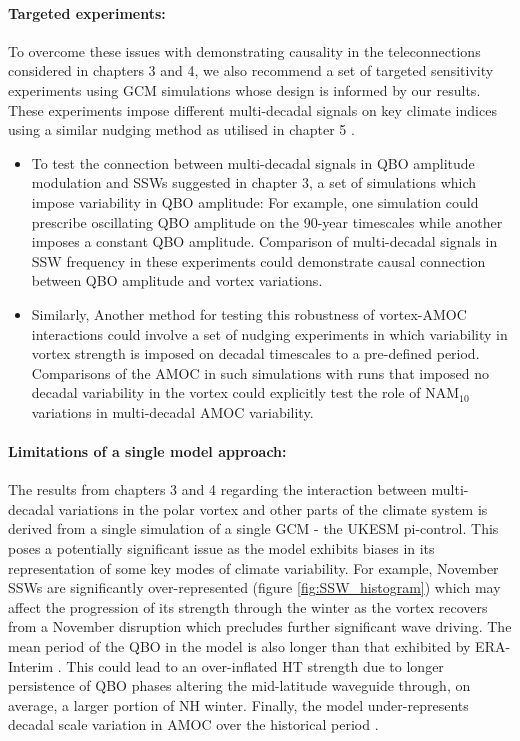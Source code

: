 \paragraph{Targeted experiments:}
To overcome these issues with demonstrating causality in the teleconnections considered in chapters 3 and 4, we also recommend a set of targeted sensitivity experiments using GCM simulations whose design is informed by our results. These experiments impose different multi-decadal signals on key climate indices using a similar nudging method as utilised in chapter 5 \citep{telfordTechnical2008}.

\begin{itemize}
    \item To test the connection between multi-decadal signals in QBO amplitude modulation and SSWs suggested in chapter 3, a set of simulations which impose variability in QBO amplitude: For example, one simulation could prescribe oscillating QBO amplitude on the 90-year timescales while another imposes a constant QBO amplitude. Comparison of multi-decadal signals in SSW frequency in these experiments could demonstrate causal connection between QBO amplitude and vortex variations.  
    
    \item Similarly, Another method for testing this robustness of vortex-AMOC interactions could involve a set of nudging experiments in which variability in vortex strength is imposed on decadal timescales to a pre-defined period. Comparisons of the AMOC in such simulations with runs that imposed no decadal variability in the vortex could explicitly test the role of NAM$_{10}$ variations in multi-decadal AMOC variability. 
\end{itemize}

\paragraph{Limitations of a single model approach:}
The results from chapters 3 and 4 regarding the interaction between multi-decadal variations in the polar vortex and other parts of the climate system is derived from a single simulation of a single GCM - the UKESM pi-control. This poses a potentially significant issue as the model exhibits biases in its representation of some key modes of climate variability. For example, November SSWs are significantly over-represented (figure \ref{fig:SSW_histogram}) which may affect the progression of its strength through the winter as the vortex recovers from a November disruption which precludes further significant wave driving. The mean period of the QBO in the model is also longer than that exhibited by ERA-Interim \citep{bushellEvaluation2020b}. This could lead to an over-inflated HT strength due to longer persistence of QBO phases altering the mid-latitude waveguide through, on average, a larger portion of NH winter. Finally, the model under-represents decadal scale variation in AMOC over the historical period \citep{robsonEvaluation2020d}. 

